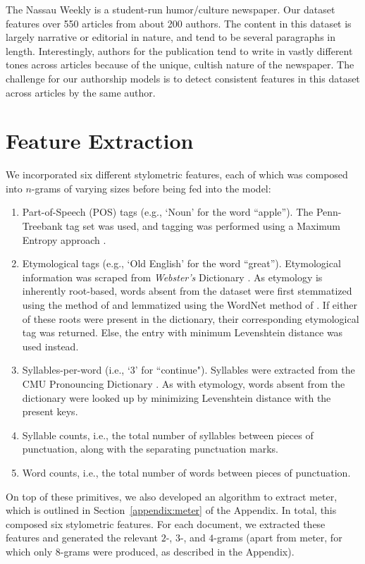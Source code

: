 \documentclass[14pt]{article} %
\theoremstyle{plain}
\theoremstyle{definition}
\theoremstyle{remark}
\begin{document}
The Nassau Weekly is a student-run humor/culture newspaper. Our dataset features over 550 articles from about 200 authors. The content in this dataset is largely narrative or editorial in nature, and tend to be several paragraphs in length. Interestingly, authors for the publication tend to write in vastly different tones across articles because of the unique, cultish nature of the newspaper. The challenge for our authorship models is to detect consistent features in this dataset across articles by the same author.

\section{Feature Extraction}

We incorporated six different stylometric features, each of which was composed into $n$-grams of varying sizes before being fed into the model:
\begin{enumerate}
\item Part-of-Speech (POS) tags (e.g., `Noun' for the word ``apple''). The Penn-Treebank tag set was used, and tagging was performed using a Maximum Entropy approach \citep{Ratnaparkhi}.
\item Etymological tags (e.g., `Old English' for the word ``great''). Etymological information was scraped from \textit{Webster's} Dictionary \citep{Dictionary}. As etymology is inherently root-based, words absent from the dataset were first stemmatized using the method of \citet{Porter} and lemmatized using the WordNet method of \citet{Fellbaum}. If either of these roots were present in the dictionary, their corresponding etymological tag was returned. Else, the entry with minimum Levenshtein distance \citep{Levenshtein} was used instead.
\item Syllables-per-word (i.e., `3' for ``continue"). Syllables were extracted from the CMU Pronouncing Dictionary \citep{Lenzo}. As with etymology, words absent from the dictionary were looked up by minimizing Levenshtein distance with the present keys.
\item Syllable counts, i.e., the total number of syllables between pieces of punctuation, along with the separating punctuation marks.
\item Word counts, i.e., the total number of words between pieces of punctuation.
\end{enumerate}On top of these primitives, we also developed an algorithm to extract meter, which is outlined in Section~\ref{appendix:meter} of the Appendix. In total, this composed six stylometric features. For each document, we extracted these features and generated the relevant $2$-, $3$-, and $4$-grams (apart from meter, for which only $8$-grams were produced, as described in the Appendix).
\end{document}
